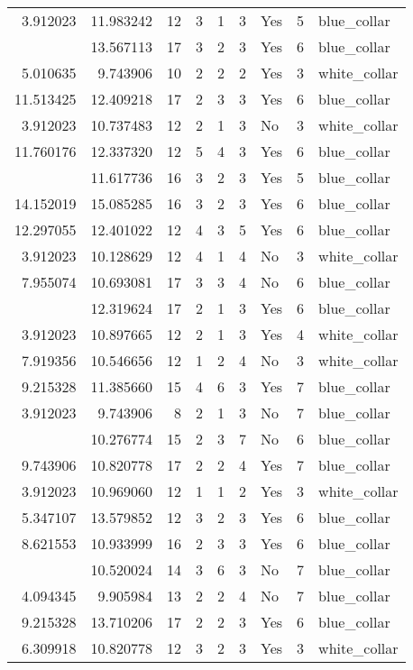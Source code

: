 \documentclass[
]{article}
\begin{document}
\begin{longtable}[t]{rrrrrllrl}
3.912023 & 11.983242 & 12 & 3 & 1 & 3 & Yes & 5 & blue\_collar\\
\addlinespace
7.673223 & 13.567113 & 17 & 3 & 2 & 3 & Yes & 6 & blue\_collar\\
5.010635 & 9.743906 & 10 & 2 & 2 & 2 & Yes & 3 & white\_collar\\
11.513425 & 12.409218 & 17 & 2 & 3 & 3 & Yes & 6 & blue\_collar\\
3.912023 & 10.737483 & 12 & 2 & 1 & 3 & No & 3 & white\_collar\\
11.760176 & 12.337320 & 12 & 5 & 4 & 3 & Yes & 6 & blue\_collar\\
\addlinespace
4.941642 & 11.617736 & 16 & 3 & 2 & 3 & Yes & 5 & blue\_collar\\
14.152019 & 15.085285 & 16 & 3 & 2 & 3 & Yes & 6 & blue\_collar\\
12.297055 & 12.401022 & 12 & 4 & 3 & 5 & Yes & 6 & blue\_collar\\
3.912023 & 10.128629 & 12 & 4 & 1 & 4 & No & 3 & white\_collar\\
7.955074 & 10.693081 & 17 & 3 & 3 & 4 & No & 6 & blue\_collar\\
\addlinespace
3.912023 & 12.319624 & 17 & 2 & 1 & 3 & Yes & 6 & blue\_collar\\
3.912023 & 10.897665 & 12 & 2 & 1 & 3 & Yes & 4 & white\_collar\\
7.919356 & 10.546656 & 12 & 1 & 2 & 4 & No & 3 & white\_collar\\
9.215328 & 11.385660 & 15 & 4 & 6 & 3 & Yes & 7 & blue\_collar\\
3.912023 & 9.743906 & 8 & 2 & 1 & 3 & No & 7 & blue\_collar\\
\addlinespace
10.310618 & 10.276774 & 15 & 2 & 3 & 7 & No & 6 & blue\_collar\\
9.743906 & 10.820778 & 17 & 2 & 2 & 4 & Yes & 7 & blue\_collar\\
3.912023 & 10.969060 & 12 & 1 & 1 & 2 & Yes & 3 & white\_collar\\
5.347107 & 13.579852 & 12 & 3 & 2 & 3 & Yes & 6 & blue\_collar\\
8.621553 & 10.933999 & 16 & 2 & 3 & 3 & Yes & 6 & blue\_collar\\
\addlinespace
12.437383 & 10.520024 & 14 & 3 & 6 & 3 & No & 7 & blue\_collar\\
4.094345 & 9.905984 & 13 & 2 & 2 & 4 & No & 7 & blue\_collar\\
9.215328 & 13.710206 & 17 & 2 & 2 & 3 & Yes & 6 & blue\_collar\\
6.309918 & 10.820778 & 12 & 3 & 2 & 3 & Yes & 3 & white\_collar\\

\end{longtable}
\end{document}
